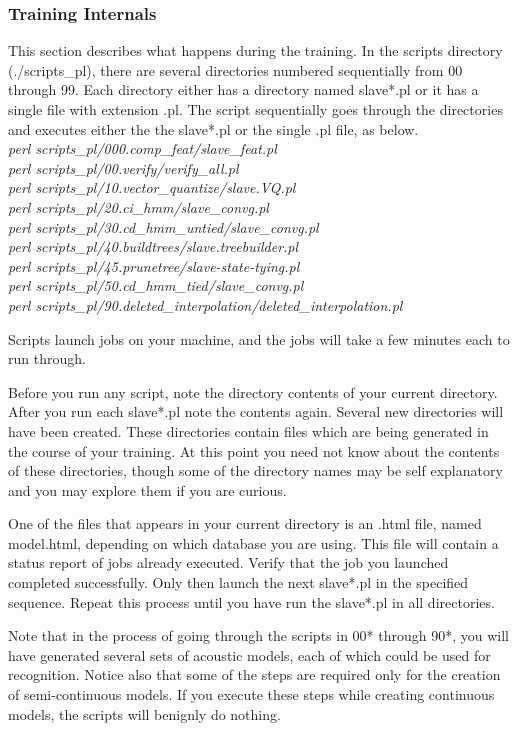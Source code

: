 \documentclass[12pt,a4paper,oneside]{memoir}
\begin{document}
\subsubsection{Training Internals}
This section describes what happens during the training. In the scripts directory (./scripts\_pl), there are several directories numbered sequentially from 00 through 99. Each directory either has a directory named slave*.pl or it has a single file with extension .pl. The script sequentially goes through the directories and executes either the the slave*.pl or the single .pl file, as below. \\
\textit{
perl scripts\_pl/000.comp\_feat/slave\_feat.pl\\
perl scripts\_pl/00.verify/verify\_all.pl\\
perl scripts\_pl/10.vector\_quantize/slave.VQ.pl\\
perl scripts\_pl/20.ci\_hmm/slave\_convg.pl\\
perl scripts\_pl/30.cd\_hmm\_untied/slave\_convg.pl\\
perl scripts\_pl/40.buildtrees/slave.treebuilder.pl\\
perl scripts\_pl/45.prunetree/slave-state-tying.pl\\
perl scripts\_pl/50.cd\_hmm\_tied/slave\_convg.pl\\
perl scripts\_pl/90.deleted\_interpolation/deleted\_interpolation.pl\\
}


 Scripts launch jobs on your machine, and the jobs will take a few minutes each to run through.

Before you run any script, note the directory contents of your current directory. After you run each slave*.pl note the contents again. Several new directories will have been created. These directories contain files which are being generated in the course of your training. At this point you need not know about the contents of these directories, though some of the directory names may be self explanatory and you may explore them if you are curious.

One of the files that appears in your current directory is an .html file, named model.html, depending on which database you are using. This file will contain a status report of jobs already executed. Verify that the job you launched completed successfully. Only then launch the next slave*.pl in the specified sequence. Repeat this process until you have run the slave*.pl in all directories.

Note that in the process of going through the scripts in 00* through 90*, you will have generated several sets of acoustic models, each of which could be used for recognition. Notice also that some of the steps are required only for the creation of semi-continuous models. If you execute these steps while creating continuous models, the scripts will benignly do nothing. 
\end{document}
